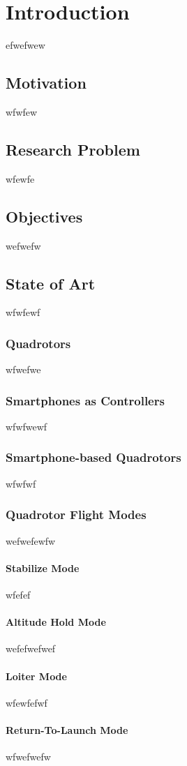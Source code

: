 \chapter{Introduction} \label{ch:introduction}
efwefwew
\section{Motivation}
wfwfew
\section{Research Problem}
wfewfe
\section{Objectives}
wefwefw

\section{State of Art}
wfwfewf

\subsection{Quadrotors}
wfwefwe
\subsection{Smartphones as Controllers}
wfwfwewf

\subsection{Smartphone-based Quadrotors}
wfwfwf
\subsection{Quadrotor Flight Modes}
wefwefewfw
\subsubsection{Stabilize Mode}
wfefef
\subsubsection{Altitude Hold Mode}
wefefwefwef
\subsubsection{Loiter Mode}
wfewfefwf
\subsubsection{Return-To-Launch Mode}
wfwefwefw
